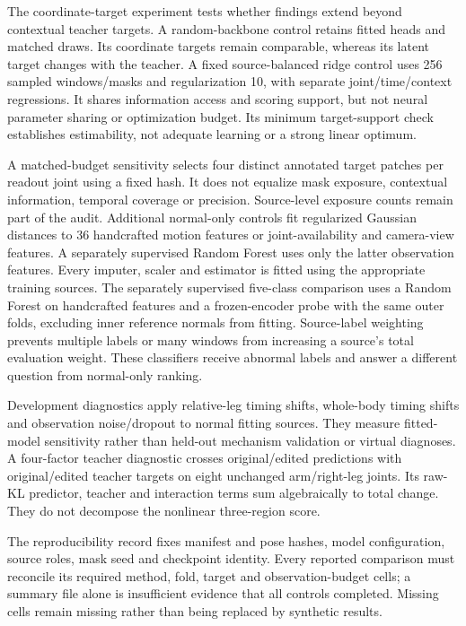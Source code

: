 \documentclass[letterpaper]{article}
\begin{document}
The coordinate-target experiment tests whether findings extend beyond contextual teacher targets. A random-backbone control retains fitted heads and matched draws. Its coordinate targets remain comparable, whereas its latent target changes with the teacher. A fixed source-balanced ridge control uses 256 sampled windows/masks and regularization 10, with separate joint/time/context regressions. It shares information access and scoring support, but not neural parameter sharing or optimization budget. Its minimum target-support check establishes estimability, not adequate learning or a strong linear optimum.

A matched-budget sensitivity selects four distinct annotated target patches per readout joint using a fixed hash. It does not equalize mask exposure, contextual information, temporal coverage or precision. Source-level exposure counts remain part of the audit. Additional normal-only controls fit regularized Gaussian distances to 36 handcrafted motion features or joint-availability and camera-view features. A separately supervised Random Forest uses only the latter observation features. Every imputer, scaler and estimator is fitted using the appropriate training sources. The separately supervised five-class comparison uses a Random Forest on handcrafted features and a frozen-encoder probe with the same outer folds, excluding inner reference normals from fitting. Source-label weighting prevents multiple labels or many windows from increasing a source's total evaluation weight. These classifiers receive abnormal labels and answer a different question from normal-only ranking.

Development diagnostics apply relative-leg timing shifts, whole-body timing shifts and observation noise/dropout to normal fitting sources. They measure fitted-model sensitivity rather than held-out mechanism validation or virtual diagnoses. A four-factor teacher diagnostic crosses original/edited predictions with original/edited teacher targets on eight unchanged arm/right-leg joints. Its raw-KL predictor, teacher and interaction terms sum algebraically to total change. They do not decompose the nonlinear three-region score.

The reproducibility record fixes manifest and pose hashes, model configuration, source roles, mask seed and checkpoint identity. Every reported comparison must reconcile its required method, fold, target and observation-budget cells; a summary file alone is insufficient evidence that all controls completed. Missing cells remain missing rather than being replaced by synthetic results.
\end{document}
